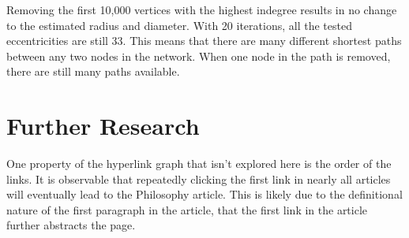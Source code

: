 \documentclass{article}
\begin{document}
Removing the first 10,000 vertices with the highest indegree results in no change to the estimated radius and diameter. 
With 20 iterations, all the tested eccentricities are still 33. This means that there are many different shortest paths between any two nodes in the network. When one node in the path is removed, there are still many paths available.

\section{Further Research}

One property of the hyperlink graph that isn't explored here is the order of the links. It is observable that repeatedly clicking the first link in nearly all articles will eventually lead to the Philosophy article. This is likely due to the definitional nature of the first paragraph in the article, that the first link in the article further abstracts the page.


\printbibliography
\end{document}
